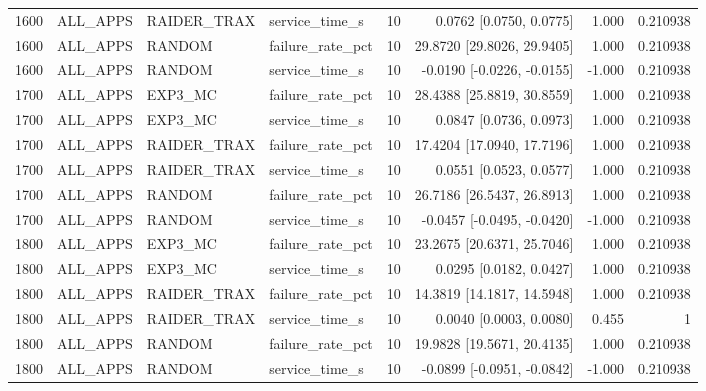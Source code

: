 \begin{tabular}{rlllrrrr}
1600 & ALL\_APPS & RAIDER\_TRAX & service\_time\_s & 10 & 0.0762 [0.0750, 0.0775] & 1.000 & 0.210938 \\
1600 & ALL\_APPS & RANDOM & failure\_rate\_pct & 10 & 29.8720 [29.8026, 29.9405] & 1.000 & 0.210938 \\
1600 & ALL\_APPS & RANDOM & service\_time\_s & 10 & -0.0190 [-0.0226, -0.0155] & -1.000 & 0.210938 \\
1700 & ALL\_APPS & EXP3\_MC & failure\_rate\_pct & 10 & 28.4388 [25.8819, 30.8559] & 1.000 & 0.210938 \\
1700 & ALL\_APPS & EXP3\_MC & service\_time\_s & 10 & 0.0847 [0.0736, 0.0973] & 1.000 & 0.210938 \\
1700 & ALL\_APPS & RAIDER\_TRAX & failure\_rate\_pct & 10 & 17.4204 [17.0940, 17.7196] & 1.000 & 0.210938 \\
1700 & ALL\_APPS & RAIDER\_TRAX & service\_time\_s & 10 & 0.0551 [0.0523, 0.0577] & 1.000 & 0.210938 \\
1700 & ALL\_APPS & RANDOM & failure\_rate\_pct & 10 & 26.7186 [26.5437, 26.8913] & 1.000 & 0.210938 \\
1700 & ALL\_APPS & RANDOM & service\_time\_s & 10 & -0.0457 [-0.0495, -0.0420] & -1.000 & 0.210938 \\
1800 & ALL\_APPS & EXP3\_MC & failure\_rate\_pct & 10 & 23.2675 [20.6371, 25.7046] & 1.000 & 0.210938 \\
1800 & ALL\_APPS & EXP3\_MC & service\_time\_s & 10 & 0.0295 [0.0182, 0.0427] & 1.000 & 0.210938 \\
1800 & ALL\_APPS & RAIDER\_TRAX & failure\_rate\_pct & 10 & 14.3819 [14.1817, 14.5948] & 1.000 & 0.210938 \\
1800 & ALL\_APPS & RAIDER\_TRAX & service\_time\_s & 10 & 0.0040 [0.0003, 0.0080] & 0.455 & 1 \\
1800 & ALL\_APPS & RANDOM & failure\_rate\_pct & 10 & 19.9828 [19.5671, 20.4135] & 1.000 & 0.210938 \\
1800 & ALL\_APPS & RANDOM & service\_time\_s & 10 & -0.0899 [-0.0951, -0.0842] & -1.000 & 0.210938 \\
\hline
\end{tabular}
